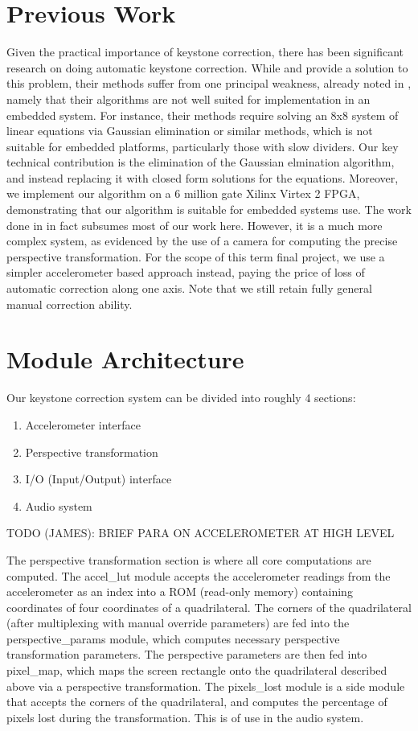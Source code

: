 \documentclass{article}
\begin{document}
\section{Previous Work}
Given the practical importance of keystone correction, there has been significant research on doing automatic keystone correction.
While \citet{raskar2001self} and \citet{sukthankar2001smarter} provide a solution to this problem, their methods suffer from one principal weakness,
already noted in \citet{baoxin2004automatic}, namely that their algorithms are not well suited for implementation in an embedded system.
For instance, their methods require solving an 8x8 system of linear equations via Gaussian elimination or similar methods,
which is not suitable for embedded platforms, particularly those with slow dividers.
Our key technical contribution is the elimination of the Gaussian elmination algorithm,
and instead replacing it with closed form solutions for the equations.
Moreover, we implement our algorithm on a 6 million gate Xilinx Virtex 2 FPGA, demonstrating that our algorithm is suitable for embedded systems use.
The work done in \citet{baoxin2004automatic} in fact subsumes most of our work here.
However, it is a much more complex system, as evidenced by the use of a camera for computing the precise perspective transformation.
For the scope of this term final project,
we use a simpler accelerometer based approach instead, paying the price of loss of automatic correction along one axis.
Note that we still retain fully general manual correction ability.

\section{Module Architecture}
Our keystone correction system can be divided into roughly 4 sections:
\begin{enumerate}
\item Accelerometer interface
\item Perspective transformation
\item  I/O (Input/Output) interface
\item Audio system
\end{enumerate}

TODO (JAMES): BRIEF PARA ON ACCELEROMETER AT HIGH LEVEL

The perspective transformation section is where all core computations are computed.
The accel\_lut module accepts the accelerometer readings from the accelerometer as an index into a ROM (read-only memory) containing coordinates of four coordinates of a quadrilateral.
The corners of the quadrilateral (after multiplexing with manual override parameters) are fed into the perspective\_params module, which computes necessary perspective transformation parameters.
The perspective parameters are then fed into pixel\_map, which maps the screen rectangle onto the quadrilateral described above via a perspective transformation.
The pixels\_lost module is a side module that accepts the corners of the quadrilateral, and computes the percentage of pixels lost during the transformation.
This is of use in the audio system.
\end{document}
